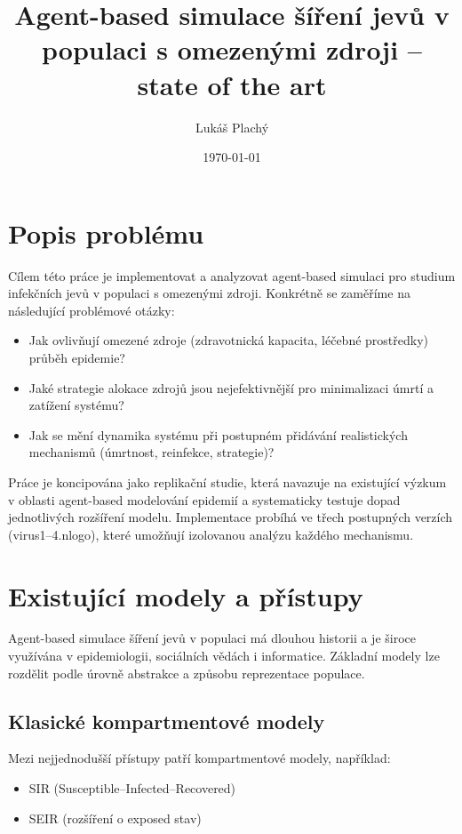 \documentclass{article}
\title{Agent-based simulace šíření jevů v populaci s omezenými zdroji -- state of the art}
\author{Lukáš Plachý}
\date{\today}
\begin{document}
\maketitle

\section{Popis problému}

Cílem této práce je implementovat a analyzovat agent-based simulaci pro studium infekčních jevů v populaci s omezenými zdroji. Konkrétně se zaměříme na následující problémové otázky:

\begin{itemize}
\item Jak ovlivňují omezené zdroje (zdravotnická kapacita, léčebné prostředky) průběh epidemie?
\item Jaké strategie alokace zdrojů jsou nejefektivnější pro minimalizaci úmrtí a zatížení systému?
\item Jak se mění dynamika systému při postupném přidávání realistických mechanismů (úmrtnost, reinfekce, strategie)?
\end{itemize}

Práce je koncipována jako replikační studie, která navazuje na existující výzkum v oblasti agent-based modelování epidemií a systematicky testuje dopad jednotlivých rozšíření modelu. Implementace probíhá ve třech postupných verzích (virus1--4.nlogo), které umožňují izolovanou analýzu každého mechanismu.

\section{Existující modely a přístupy}

Agent-based simulace šíření jevů v populaci má dlouhou historii a je široce využívána v epidemiologii, sociálních vědách i informatice. Základní modely lze rozdělit podle úrovně abstrakce a způsobu reprezentace populace.

\subsection{Klasické kompartmentové modely}

Mezi nejjednodušší přístupy patří kompartmentové modely, například:

\begin{itemize}
\item SIR (Susceptible--Infected--Recovered)
\item SEIR (rozšíření o exposed stav)
\end{itemize}
\end{document}
